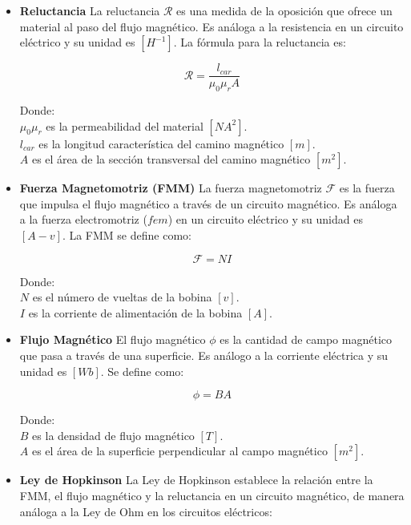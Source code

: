 \begin{itemize}
    \item \textbf{Reluctancia}
    La reluctancia \(\mathcal{R}\) es una medida de la oposición que ofrece un material al paso del flujo magnético. Es análoga a la resistencia en un circuito eléctrico y su unidad es \([H^{-1}]\). La fórmula para la reluctancia es:
    
    \[\mathcal{R}=\frac{l_{car}}{\mu_0\mu_r A}\] 
    
    Donde:\\
    \(\mu_0\mu_r\) es la permeabilidad del material \([NA^2]\).\\
    \(l_{car}\) es la longitud característica del camino magnético \([m]\).\\
    \(A\) es el área de la sección transversal del camino magnético \([m^2]\).\\

    \item \textbf{Fuerza Magnetomotriz (FMM)}
    La fuerza magnetomotriz \(\mathcal{F}\) es la fuerza que impulsa el flujo magnético a través de un circuito magnético. Es análoga a la fuerza electromotriz (\(fem\)) en un circuito eléctrico y su unidad es \([A-v]\). La FMM se define como:
    
    \[\mathcal{F}=NI\]
    
    Donde:\\
    \(N\) es el número de vueltas de la bobina \([v]\).\\
    \(I\) es la corriente de alimentación de la bobina \([A]\).\\

    \item \textbf{Flujo Magnético}
    El flujo magnético \(\phi\) es la cantidad de campo magnético que pasa a través de una superficie. Es análogo a la corriente eléctrica y su unidad es \([Wb]\). Se define como:
    
    \[\phi = BA\]
    
    Donde:\\
    \(B\) es la densidad de flujo magnético \([T]\).\\
    \(A\) es el área de la superficie perpendicular al campo magnético \([m^2]\).\\

    \item \textbf{Ley de Hopkinson}
    La Ley de Hopkinson establece la relación entre la FMM, el flujo magnético y la reluctancia en un circuito magnético, de manera análoga a la Ley de Ohm en los circuitos eléctricos:
    

\end{itemize}
